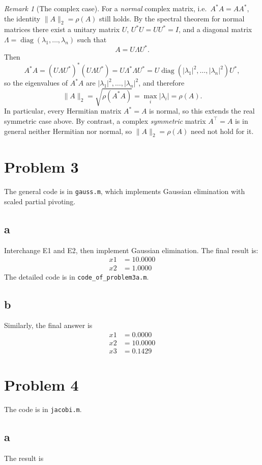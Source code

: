 \documentclass[11pt,a4paper]{report}
\theoremstyle{remark}
\newtheorem*{remark}{Remark}
\begin{document}
\begin{remark}[The complex case]
For a \emph{normal} complex matrix, i.e.\ \(A^*A=AA^*\), the identity
\(\|A\|_2=\rho(A)\) still holds. By the spectral theorem for normal matrices
there exist a unitary matrix \(U\), \(U^*U=UU^*=I\), and a diagonal matrix
\(\Lambda=\operatorname{diag}(\lambda_1,\dots,\lambda_n)\) such that
\[
A=U\Lambda U^*.
\]
Then
\[
A^*A=(U\Lambda U^*)^*(U\Lambda U^*)=U\Lambda^*\Lambda U^*
=U\operatorname{diag}(|\lambda_1|^2,\dots,|\lambda_n|^2)U^*,
\]
so the eigenvalues of \(A^*A\) are \(|\lambda_1|^2,\dots,|\lambda_n|^2\), and
therefore
\[
\|A\|_2=\sqrt{\rho(A^*A)}=\max_i|\lambda_i|=\rho(A).
\]
In particular, every Hermitian matrix \(A^*=A\) is normal, so this extends the
real symmetric case above. By contrast, a complex \emph{symmetric} matrix
\(A^\top=A\) is in general neither Hermitian nor normal, so
\(\|A\|_2=\rho(A)\) need not hold for it.
\end{remark}

\section*{Problem 3}
The general code is in \texttt{gauss.m}, which implements Gaussian elimination with scaled partial pivoting.
\subsection*{a}
Interchange E1 and E2, then implement Gaussian elimination.
The final result is:
\begin{align*}
     x1 &= 10.0000 \\
     x2 &= 1.0000
\end{align*}
The detailed code is in \texttt{code\_of\_problem3a.m}.
\subsection*{b}
Similarly, the final answer is
\begin{align*}
  x1 &=0.0000 \\
  x2 &=10.0000 \\
  x3 &= 0.1429
\end{align*}
\section*{Problem 4}
The code is in \texttt{jacobi.m}.
\subsection*{a}
The result is
\end{document}
